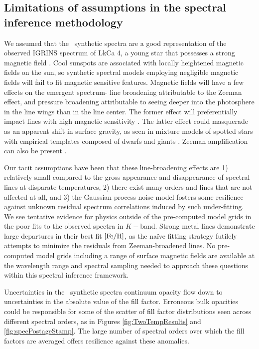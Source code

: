 \documentclass[twocolumn]{emulateapj}%
\begin{document}
\subsection{Limitations of assumptions in the spectral inference methodology}

We assumed that the \PHOENIX\ synthetic spectra are a good representation of the observed IGRINS spectrum of LkCa 4, a young star that possesses a strong magnetic field \citep{donati14}.  Cool sunspots are associated with locally heightened magnetic fields on the sun, so synthetic spectral models employing negligible magnetic fields will fail to fit magnetic sensitive features.  Magnetic fields will have a few effects on the emergent spectrum- line broadening attributable to the Zeeman effect, and pressure broadening attributable to seeing deeper into the photosphere in the line wings than in the line center.  The former effect will preferentially impact lines with high magnetic sensitivity \citep[\emph{e.g.}][]{johnskrull99,deen13}.  The latter effect could masquerade as an apparent shift in surface gravity, as seen in mixture models of spotted stars with empirical templates composed of dwarfs and giants \citep{oneal96}.  Zeeman amplification can also be present \citep{basri92}.

Our tacit assumptions have been that these line-broadening effects are 1) relatively small compared to the gross appearance and disappearance of spectral lines at disparate temperatures, 2) there exist many orders and lines that are not affected at all, and 3) the Gaussian process noise model fosters some resilience against unknown residual spectrum correlations induced by such under-fitting.  We see tentative evidence for physics outside of the pre-computed model grids in the poor fits to the observed spectra in $K-$band.  Strong metal lines demonstrate large departures in their best fit $[{\rm Fe}/{\rm H}]$, as the na\"{i}ve fitting strategy futilely attempts to minimize the residuals from Zeeman-broadened lines.  No pre-computed model grids including a range of surface magnetic fields are available at the wavelength range and spectral sampling needed to approach these questions within this spectral inference framework.

Uncertainties in the \PHOENIX\ synthetic spectra continuum opacity flow down to uncertainties in the absolute value of the fill factor.  Erroneous bulk opacities could be responsible for some of the scatter of fill factor distributions seen across different spectral orders, as in Figures \ref{fig:TwoTempResults} and \ref{fig:specPostageStamp}.  The large number of spectral orders over which the fill factors are averaged offers resilience against these anomalies.
\end{document}
